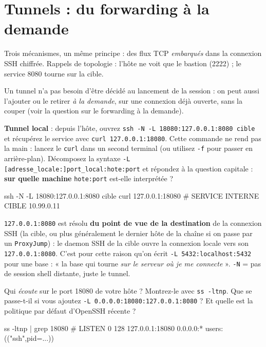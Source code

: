 \documentclass[a4paper,10pt]{exam}
\begin{document}
\section{Tunnels : du forwarding à la demande}

Trois mécanismes, un même principe : des flux TCP \emph{embarqués} dans la connexion SSH
chiffrée. Rappels de topologie : l'hôte ne voit que le bastion (2222) ; le service 8080
tourne sur la cible.

Un tunnel n'a pas besoin d'être décidé au lancement de la session : on peut aussi
l'ajouter ou le retirer \emph{à la demande}, sur une connexion déjà ouverte, sans la
couper (voir la question sur le forwarding à la demande).

\begin{questions}
\question \textbf{Tunnel local} : depuis l'hôte, ouvrez
\texttt{ssh -N -L 18080:127.0.0.1:8080 cible} et récupérez le service avec
\texttt{curl 127.0.0.1:18080}. Cette commande ne rend pas la main : lancez le \texttt{curl} dans un second terminal (ou utilisez \texttt{-f} pour passer en arrière-plan). Décomposez la syntaxe \texttt{-L
[adresse\_locale:]port\_local:hote:port} et répondez à la question capitale :
\textbf{sur quelle machine} \texttt{hote:port} est-elle interprétée ?
\begin{solution}
\begin{bashcode}
ssh -N -L 18080:127.0.0.1:8080 cible
curl 127.0.0.1:18080
# SERVICE INTERNE CIBLE 10.99.0.11
\end{bashcode}
\texttt{127.0.0.1:8080} est résolu \textbf{du point de vue de la destination} de la
connexion SSH (la cible, ou plus généralement le dernier hôte de la chaîne si on passe
par un \texttt{ProxyJump}) : le daemon SSH de la cible ouvre la connexion locale vers son
\texttt{127.0.0.1:8080}. C'est pour cette raison qu'on écrit
\texttt{-L 5432:localhost:5432} pour une base : « la base qui tourne \emph{sur le serveur
où je me connecte} ».
\texttt{-N} = pas de session shell distante, juste le tunnel.
\end{solution}
\question Qui \emph{écoute} sur le port 18080 de votre hôte ? Montrez-le avec
\texttt{ss -ltnp}. Que se passe-t-il si vous ajoutez
\texttt{-L 0.0.0.0:18080:127.0.0.1:8080} ? Et quelle est la politique par défaut d'OpenSSH
récente ?
\begin{solution}
\begin{bashcode}
ss -ltnp | grep 18080
# LISTEN  0  128  127.0.0.1:18080  0.0.0.0:*  users:(("ssh",pid=...))
\end{bashcode}

\end{solution}
\end{questions}
\end{document}
